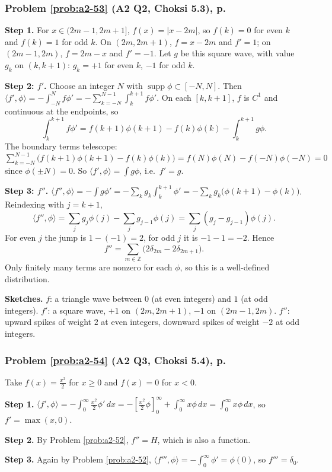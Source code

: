 \documentclass{article}
\newcommand{\ip}[2]{\langle #1, #2 \rangle}
\begin{document}
\subsubsection*{Problem \ref{prob:a2-53} (A2 Q2, Choksi 5.3), p.~\pageref{prob:a2-53}}
\textbf{Step 1.} For $x \in (2m-1, 2m+1]$, $f(x) = |x - 2m|$, so $f(k) = 0$ for even $k$ and $f(k) = 1$ for odd $k$. On $(2m, 2m+1)$, $f = x - 2m$ and $f' = 1$; on $(2m-1, 2m)$, $f = 2m - x$ and $f' = -1$. Let $g$ be this square wave, with value $g_k$ on $(k, k+1)$: $g_k = +1$ for even $k$, $-1$ for odd $k$.\par
\textbf{Step 2: $f'$.} Choose an integer $N$ with $\operatorname{supp}\phi \subset [-N,N]$. Then $\ip{f'}{\phi} = -\int_{-N}^Nf\phi' = -\sum_{k=-N}^{N-1}\int_k^{k+1}f\phi'$. On each $[k,k+1]$, $f$ is $C^1$ and continuous at the endpoints, so
\begin{equation*}
    \int_k^{k+1}f\phi' = f(k+1)\phi(k+1) - f(k)\phi(k) - \int_k^{k+1}g\phi.
\end{equation*}
The boundary terms telescope: $\sum_{k=-N}^{N-1}\big(f(k+1)\phi(k+1) - f(k)\phi(k)\big) = f(N)\phi(N) - f(-N)\phi(-N) = 0$ since $\phi(\pm N) = 0$. So $\ip{f'}{\phi} = \int g\phi$, i.e.\ $f' = g$.\par
\textbf{Step 3: $f''$.} $\ip{f''}{\phi} = -\int g\phi' = -\sum_kg_k\int_k^{k+1}\phi' = -\sum_kg_k\big(\phi(k+1) - \phi(k)\big)$. Reindexing with $j = k+1$,
\begin{equation*}
    \ip{f''}{\phi} = \sum_jg_j\phi(j) - \sum_jg_{j-1}\phi(j) = \sum_j(g_j - g_{j-1})\phi(j).
\end{equation*}
For even $j$ the jump is $1 - (-1) = 2$, for odd $j$ it is $-1 - 1 = -2$. Hence
\begin{equation*}
    f'' = \sum_{m\in\mathbb{Z}}\big(2\delta_{2m} - 2\delta_{2m+1}\big).
\end{equation*}
Only finitely many terms are nonzero for each $\phi$, so this is a well-defined distribution.\par
\textbf{Sketches.} $f$: a triangle wave between $0$ (at even integers) and $1$ (at odd integers). $f'$: a square wave, $+1$ on $(2m,2m+1)$, $-1$ on $(2m-1,2m)$. $f''$: upward spikes of weight $2$ at even integers, downward spikes of weight $-2$ at odd integers.

\label{sol:a2-54}
\subsubsection*{Problem \ref{prob:a2-54} (A2 Q3, Choksi 5.4), p.~\pageref{prob:a2-54}}
Take $f(x) = \frac{x^2}{2}$ for $x \geq 0$ and $f(x) = 0$ for $x < 0$.\par
\textbf{Step 1.} $\ip{f'}{\phi} = -\int_0^\infty\frac{x^2}{2}\phi'\,dx = -\left[\frac{x^2}{2}\phi\right]_0^\infty + \int_0^\infty x\phi\,dx = \int_0^\infty x\phi\,dx$, so $f' = \max(x,0)$.\par
\textbf{Step 2.} By Problem \ref{prob:a2-52}, $f'' = H$, which is also a function.\par
\textbf{Step 3.} Again by Problem \ref{prob:a2-52}, $\ip{f'''}{\phi} = -\int_0^\infty\phi' = \phi(0)$, so $f''' = \delta_0$.
\end{document}
